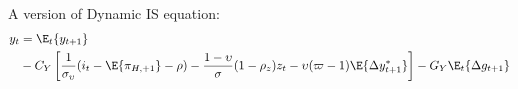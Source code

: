 A version of Dynamic IS equation:
\begin{align}
    y_t  &= \E_t\{y_{t+1}\} \nonumber \\ 
        &- C_Y\left[\frac{1}{\sigma_\upsilon}(i_t - \E \{ \pi_{H,+1}\} - \rho) - \frac{1-\upsilon}{\sigma} (1-\rho_z)z_t - \upsilon (\varpi - 1)\E \{\Delta y_{t+1}^* \}\right] - G_Y \E_t \{\Delta g_{t+1}\} \label{eq:dynamic_is_end}
\end{align}
\newpage